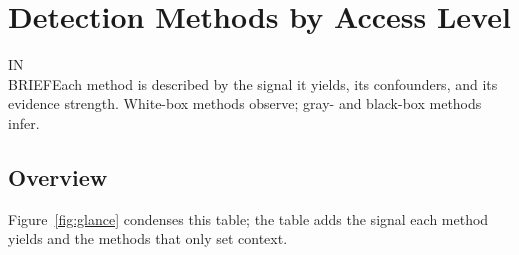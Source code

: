 \documentclass[11pt,letterpaper]{article}
\newcommand{\inbrief}[1]{\begin{inbriefbox}IN\\BRIEF\tcblower #1\end{inbriefbox}}
\begin{document}
\section{Detection Methods by Access Level}
\label{sec:methods}

\inbrief{Each method is described by the signal it yields, its confounders, and its evidence strength. White-box methods observe; gray- and black-box methods infer.}

\subsection{Overview}

Figure~\ref{fig:glance} condenses this table; the table adds the signal each method yields and the methods that only set context.
\end{document}
